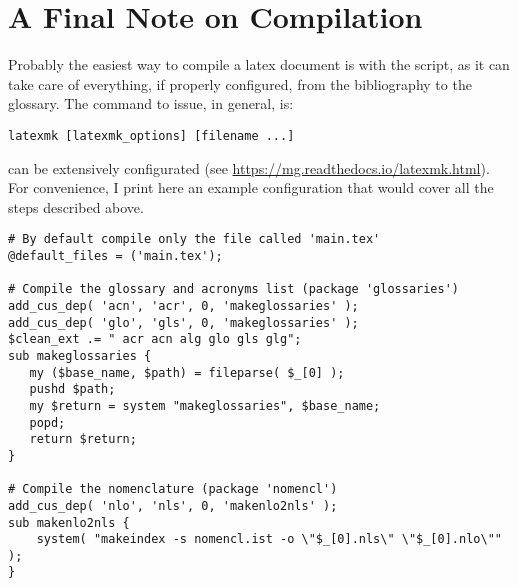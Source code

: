 \section{A Final Note on Compilation}

Probably the easiest way to compile a latex document is with the 
 script, as it can take care of everything, if properly 
configured, from the bibliography to the glossary. The command to issue, 
in general, is:

\begin{lstlisting}
latexmk [latexmk_options] [filename ...]
\end{lstlisting}

 can be extensively configurated (see 
\url{https://mg.readthedocs.io/latexmk.html}). For convenience, I print 
here an example configuration that would cover all the steps described 
above.

\begin{lstlisting}
# By default compile only the file called 'main.tex'
@default_files = ('main.tex');

# Compile the glossary and acronyms list (package 'glossaries')
add_cus_dep( 'acn', 'acr', 0, 'makeglossaries' );
add_cus_dep( 'glo', 'gls', 0, 'makeglossaries' );
$clean_ext .= " acr acn alg glo gls glg";
sub makeglossaries {
   my ($base_name, $path) = fileparse( $_[0] );
   pushd $path;
   my $return = system "makeglossaries", $base_name;
   popd;
   return $return;
}

# Compile the nomenclature (package 'nomencl')
add_cus_dep( 'nlo', 'nls', 0, 'makenlo2nls' );
sub makenlo2nls {
    system( "makeindex -s nomencl.ist -o \"$_[0].nls\" \"$_[0].nlo\"" );
}
\end{lstlisting}
